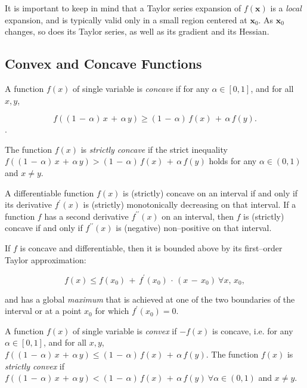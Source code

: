 \documentclass[graybox,envcountchap,sectrefs]{svmono}\usepackage[]{graphicx}\usepackage[]{xcolor}
\begin{document}
\begin{appendices}
It is important to keep in mind that a Taylor series expansion of
$f\left(\mathrm{\mathbf{x}}\right)$ is a \emph{local} expansion,
and is typically valid only in a small region centered at $\mathrm{\mathbf{x}}_{0}$.
As $\mathrm{\mathbf{x}}_{0}$ changes, so does its Taylor series,
as well as its gradient and its Hessian. 

\subsection{Convex and Concave Functions\label{subsec:ConvexFunctions} }

A function $f(x)$ of single variable is \emph{concave} if for any
$\alpha\in[0,1]$, and for all $x,y$, 

\begin{equation}
f((1\,-\,\alpha)\,x\,+\,\alpha\,y)\geqslant(1\,-\,\alpha)\,f(x)\,+\,\alpha\,f(y).\label{eq:ConcaveFunction}
\end{equation}
. 

The function $f(x)$ is \emph{strictly concave} if the strict inequality
$f((1\,-\,\alpha)\,x\,+\,\alpha\,y)>(1\,-\,\alpha)\,f(x)\,+\,\alpha\,f(y)$
holds for any $\alpha\in(0,1)$ and $x\ne y$.

A differentiable function $f(x)$ is (strictly) concave on an interval
if and only if its derivative $f^{\prime}(x)$ is (strictly) monotonically
decreasing on that interval. If a function $f$ has a second derivative
$f^{\prime\prime}(x)$ on an interval, then $f$ is (strictly) concave
if and only if $f^{\prime\prime}(x)$ is (negative) non--positive
on that interval.

If $f$ is concave and differentiable, then it is bounded above by
its first--order Taylor approximation:

\begin{equation}
f(x)\leqslant f(x_{0})\,+\,f^{\prime}(x_{0})\,\cdot\,(x\,-\,x_{0})\ \forall x,\,x_{0},\label{eq:ConcaveFunctionUpperBound}
\end{equation}

and has a global \emph{maximum} that is achieved at one of the two
boundaries of the interval or at a point $x_{0}$ for which $f^{\prime}(x_{0})=0.$ 

A function $f(x)$ of single variable is \emph{convex} if $-f(x)$
is concave, i.e. for any $\alpha\in[0,1]$, and for all $x,y$,  $f((1\,-\,\alpha)\,x\,+\,\alpha\,y)\leqslant(1\,-\,\alpha)\,f(x)\,+\,\alpha\,f(y)$.
The function $f(x)$ is \emph{strictly convex} if $f((1\,-\,\alpha)\,x\,+\,\alpha\,y)<(1\,-\,\alpha)\,f(x)\,+\,\alpha\,f(y)\ \forall\alpha\in(0,1)$
and $x\ne y$.


\end{appendices}
\end{document}
